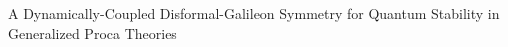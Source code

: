 \documentclass[twocolumn]{aastex631}
\begin{document}
A Dynamically-Coupled Disformal-Galileon Symmetry for Quantum Stability in Generalized Proca Theories
\end{document}
